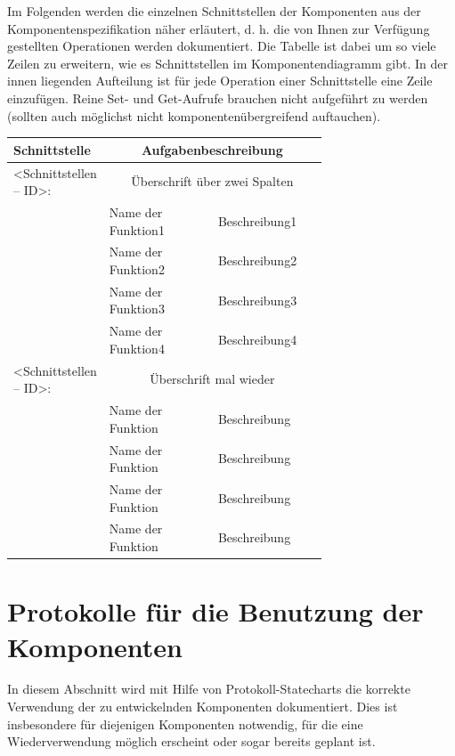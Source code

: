 Im Folgenden werden die einzelnen Schnittstellen der Komponenten aus der
Komponentenspezifikation näher erläutert, d. h. die von Ihnen zur Verfügung
gestellten Operationen werden dokumentiert. Die Tabelle ist dabei um so viele
Zeilen zu erweitern, wie es Schnittstellen im Komponentendiagramm gibt. In der
innen liegenden Aufteilung ist für jede Operation einer Schnittstelle eine
Zeile einzufügen.  Reine Set- und Get-Aufrufe brauchen nicht aufgeführt zu
werden (sollten auch möglichst nicht komponentenübergreifend auftauchen).

\begin{tabular}[ht]{|l|p{0.35\linewidth}|p{0.35\linewidth}|}
 \hline
 Schnittstelle & \multicolumn{2}{|c|}{Aufgabenbeschreibung}\\
 \hline\hline
    <Schnittstellen – ID>: & \multicolumn{2}{|c|}{Überschrift über zwei Spalten}\\
 \hline
 & Name der Funktion1 & Beschreibung1\\ 
 & Name der Funktion2 & Beschreibung2\\ 
 & Name der Funktion3 & Beschreibung3\\ 
 & Name der Funktion4 & Beschreibung4\\ 
\hline
    <Schnittstellen – ID>: & \multicolumn{2}{|c|}{Überschrift mal wieder}\\
 \hline
 & Name der Funktion & Beschreibung\\ 
 & Name der Funktion & Beschreibung\\ 
 & Name der Funktion & Beschreibung\\ 
 & Name der Funktion & Beschreibung\\ 
 \hline
   \end{tabular}





\section{Protokolle für die Benutzung der Komponenten}

In diesem Abschnitt wird mit Hilfe von Protokoll-Statecharts die korrekte
Verwendung der zu entwickelnden Komponenten dokumentiert. Dies ist insbesondere
für diejenigen Komponenten notwendig, für die eine Wiederverwendung möglich
erscheint oder sogar bereits geplant ist.


